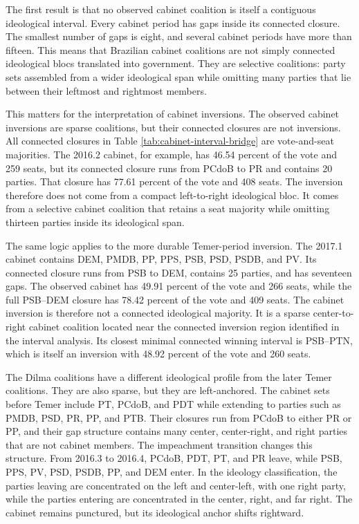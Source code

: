 \documentclass[11pt]{article}
\begin{document}


The first result is that no observed cabinet coalition is itself a contiguous
ideological interval. Every cabinet period has gaps inside its connected closure.
The smallest number of gaps is eight, and several cabinet periods have more than
fifteen. This means that Brazilian cabinet coalitions are not simply connected
ideological blocs translated into government. They are selective coalitions: party
sets assembled from a wider ideological span while omitting many parties that
lie between their leftmost and rightmost members.

This matters for the interpretation of cabinet inversions. The observed cabinet
inversions are sparse coalitions, but their connected closures are not inversions.
All connected closures in Table \ref{tab:cabinet-interval-bridge} are
vote-and-seat majorities. The 2016.2 cabinet, for example, has 46.54 percent of
the vote and 259 seats, but its connected closure runs from PCdoB to PR and
contains 20 parties. That closure has 77.61 percent of the vote and 408 seats.
The inversion therefore does not come from a compact left-to-right ideological
bloc. It comes from a selective cabinet coalition that retains a seat majority
while omitting thirteen parties inside its ideological span.

The same logic applies to the more durable Temer-period inversion. The 2017.1
cabinet contains DEM, PMDB, PP, PPS, PSB, PSD, PSDB, and PV. Its connected
closure runs from PSB to DEM, contains 25 parties, and has seventeen gaps. The
observed cabinet has 49.91 percent of the vote and 266 seats, while the full
PSB--DEM closure has 78.42 percent of the vote and 409 seats. The cabinet
inversion is therefore not a connected ideological majority. It is a sparse
center-to-right cabinet coalition located near the connected inversion region
identified in the interval analysis. Its closest minimal connected winning
interval is PSB--PTN, which is itself an inversion with 48.92 percent of the vote
and 260 seats.

The Dilma coalitions have a different ideological profile from the later
Temer coalitions. They are also sparse, but they are left-anchored. The cabinet
sets before Temer include PT, PCdoB, and PDT while extending to parties such
as PMDB, PSD, PR, PP, and PTB. Their closures run from PCdoB to either PR or
PP, and their gap structure contains many center, center-right, and right parties
that are not cabinet members. The impeachment transition changes this structure.
From 2016.3 to 2016.4, PCdoB, PDT, PT, and PR leave, while PSB, PPS, PV, PSD,
PSDB, PP, and DEM enter. In the ideology classification, the parties leaving are
concentrated on the left and center-left, with one right party, while the parties
entering are concentrated in the center, right, and far right. The cabinet remains
punctured, but its ideological anchor shifts rightward.
\end{document}
